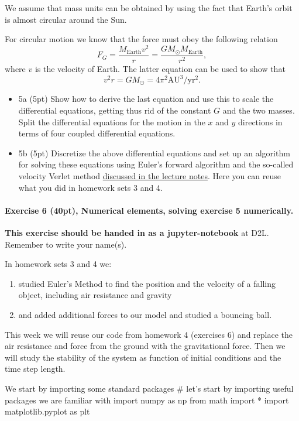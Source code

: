 \documentclass[%
oneside,                 %
final,                   %
10pt]{article}
\begin{document}
We assume that mass units can be obtained by using the fact that
Earth's orbit is almost circular around the Sun.

For circular motion we know that the force must obey the following relation
\[
F_G= \frac{M_{\mathrm{Earth}}v^2}{r}=\frac{GM_{\odot}M_{\mathrm{Earth}}}{r^2},
\]
where $v$ is the velocity of Earth. 
The latter equation can be used to show that
\[
v^2r=GM_{\odot}=4\pi^2\mathrm{AU}^3/\mathrm{yr}^2.
\]
\begin{itemize}
\item 5a (5pt) Show how to derive the last equation and use this to scale the differential equations, getting thus rid of the constant $G$ and the two masses. Split the differential equations for the motion in the $x$ and $y$ directions in terms of four coupled differential equations.

\item 5b (5pt)  Discretize the above differential equations and set up an algorithm for solving these equations using Euler's forward algorithm and the so-called velocity Verlet method \href{{https://mhjensen.github.io/Physics321/doc/pub/week7/html/week7.html}}{discussed in the lecture notes}. Here you can reuse what you did in homework sets 3 and 4.
\end{itemize}

\noindent
\paragraph{Exercise 6 (40pt), Numerical elements, solving exercise 5 numerically.}
\textbf{This exercise should be handed in as a jupyter-notebook} at D2L. Remember to write your name(s). 

In homework sets 3 and 4 we:
\begin{enumerate}
\item studied  Euler's Method to find the position and the velocity of a falling object, including air resistance and gravity

\item and added additional forces to our model and studied a bouncing ball.
\end{enumerate}

\noindent
This week we will reuse our code from homework 4 (exercises 6)
and replace the air resistance and force from the ground with the
gravitational force. Then we will study the stability of the system as function of initial conditions and the time step length.

We start by importing some standard packages
\bpycod
# let's start by importing useful packages we are familiar with
import numpy as np
from math import *
import matplotlib.pyplot as plt
\epycod
\end{document}
